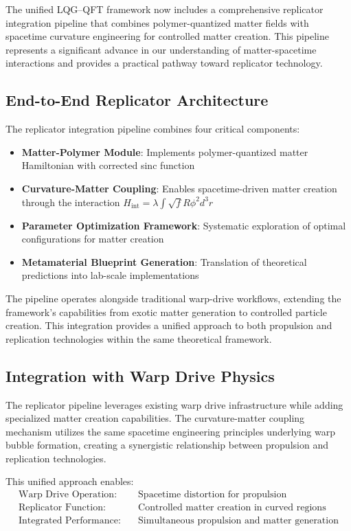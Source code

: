\documentclass[11pt]{article}
\begin{document}
The unified LQG–QFT framework now includes a comprehensive replicator integration pipeline that combines polymer-quantized matter fields with spacetime curvature engineering for controlled matter creation. This pipeline represents a significant advance in our understanding of matter-spacetime interactions and provides a practical pathway toward replicator technology.

\subsection{End-to-End Replicator Architecture}

The replicator integration pipeline combines four critical components:
\begin{itemize}
\item \textbf{Matter-Polymer Module}: Implements polymer-quantized matter Hamiltonian with corrected sinc function
\item \textbf{Curvature-Matter Coupling}: Enables spacetime-driven matter creation through the interaction $H_{\text{int}} = \lambda \int \sqrt{f} R \phi^2 d^3r$
\item \textbf{Parameter Optimization Framework}: Systematic exploration of optimal configurations for matter creation
\item \textbf{Metamaterial Blueprint Generation}: Translation of theoretical predictions into lab-scale implementations
\end{itemize}

The pipeline operates alongside traditional warp-drive workflows, extending the framework's capabilities from exotic matter generation to controlled particle creation. This integration provides a unified approach to both propulsion and replication technologies within the same theoretical framework.

\subsection{Integration with Warp Drive Physics}

The replicator pipeline leverages existing warp drive infrastructure while adding specialized matter creation capabilities. The curvature-matter coupling mechanism utilizes the same spacetime engineering principles underlying warp bubble formation, creating a synergistic relationship between propulsion and replication technologies.

This unified approach enables:
\begin{align}
\text{Warp Drive Operation:} &\quad \text{Spacetime distortion for propulsion} \\
\text{Replicator Function:} &\quad \text{Controlled matter creation in curved regions} \\
\text{Integrated Performance:} &\quad \text{Simultaneous propulsion and matter generation}
\end{align}
\end{document}
